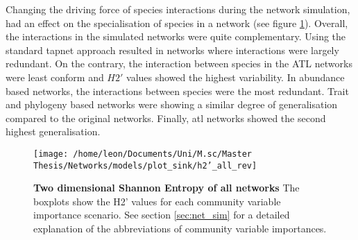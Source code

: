 \documentclass[12pt,a4paper]{article}
\begin{document}
Changing the driving force of species interactions during the network simulation, had an effect on the specialisation of species in a network (see figure \ref{fig:h2}). Overall, the interactions in the simulated networks were quite complementary. Using the standard tapnet approach resulted in networks where interactions were largely redundant. On the contrary, the interaction between species in the ATL networks were least conform and $H2'$ values showed the highest variability. In abundance based networks, the interactions between species were the most redundant. Trait and phylogeny based networks were showing a similar degree of generalisation compared to the original networks. Finally, atl networks showed the second highest generalisation.

\begin{figure}[H]
	 \centering
	 \texttt{[image: /home/leon/Documents/Uni/M.sc/Master Thesis/Networks/models/plot\_sink/h2'\_all\_rev]}
	 \captionsetup{width = .8\textwidth}
	 \caption[Two dimensional Shannon Entropy of all networks]{\textbf{Two dimensional Shannon Entropy of all networks} The boxplots show the H2' values \parencite{Bluethgen2006} for each community variable importance scenario. See section \ref{sec:net_sim} for a detailed explanation of the abbreviations of community variable importances.}
	 \label{fig:h2}
\end{figure}
\end{document}
